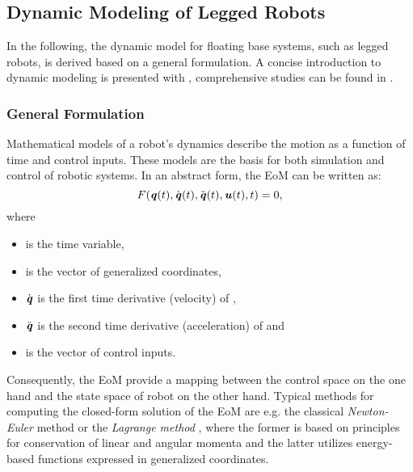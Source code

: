 \subsection{Dynamic Modeling of Legged Robots}\label{subsec:DynamicModeling}
In the following, the dynamic model for floating base systems, such as legged robots, is derived based on a general formulation. A concise introduction to dynamic modeling is presented with \cite{scaronTeaching}, comprehensive studies can be found in \cite{pfeiffer1996multibody, jain2010robot, featherstone2014rigid}.
\subsubsection{General Formulation}
Mathematical models of a robot's dynamics describe the motion as a function of time and control inputs. These models are the basis for both simulation and control of robotic systems. In an abstract form, the \gls{EoM} can be written as: 
\begin{equation} \label{eqn:EoMGeneral}
F(\bm{\mathit{q}}(t),\dot{\bm{\mathit{q}}}(t),\ddot{\bm{\mathit{q}}}(t),\bm{\mathit{u}}(t),t)=0,
\end{equation}
where 
\begin{itemize}
\item {} is the time variable, 
\item {} is the vector of generalized coordinates,
\item $\dot{\bm{\mathit{q}}}$ is the first time derivative (velocity) of , 
\item $\ddot{\bm{\mathit{q}}}$ is the second time derivative (acceleration) of  and
\item {} is the vector of control inputs. 
\end{itemize}
Consequently, the \gls{EoM} provide a mapping between the control space on the one hand and the state space of robot on the other hand. Typical methods for computing the closed-form solution of the \gls{EoM} are e.g. the classical \textit{Newton-Euler} \cite{luh1980line} method or the \textit{Lagrange method} \cite{hollerbach1980recursive}, where the former is based on principles for conservation of linear and angular momenta and the latter utilizes energy-based functions expressed in generalized coordinates. 
